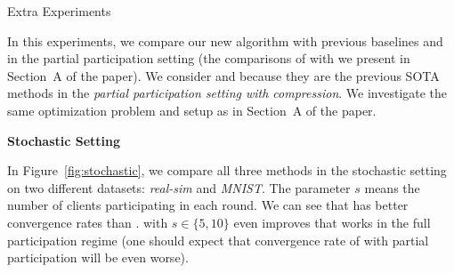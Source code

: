 \documentclass[12pt]{article}
\begin{document}
\begin{center}
    Extra Experiments
\end{center}

In this experiments, we compare our new algorithm  with previous baselines  and  in the partial participation setting (the comparisons of  with  we present in Section~A of the paper). We consider  and  because they are the previous SOTA methods in the \emph{partial participation setting with compression}. We investigate the same optimization problem and setup as in Section~A of the paper.

\begin{center}
    \bf Stochastic Setting
\end{center}

In Figure~\ref{fig:stochastic}, we compare all three methods in the stochastic setting on two different datasets: \textit{real-sim} and \textit{MNIST}. The parameter $s$ means the number of clients participating in each round. We can see that  has better convergence rates than .  with $s \in \{5, 10\}$ even improves  that works in the full participation regime (one should expect that convergence rate of  with partial participation will be even worse).
\end{document}
